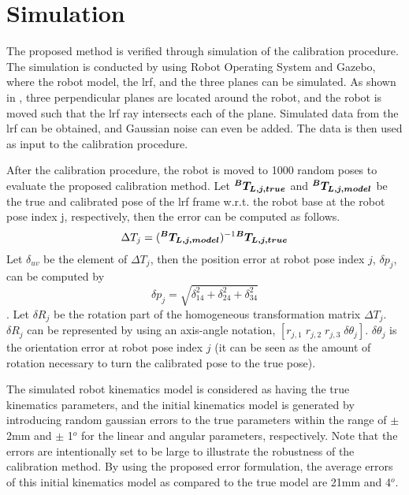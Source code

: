 \section{Simulation}
\label{sec:simulation}

The proposed method is verified through simulation of the calibration procedure. The simulation is conducted by using Robot Operating System and Gazebo, where the robot model, the \ac{lrf}, and the three planes can be simulated.  
As shown in , three perpendicular planes are located around the robot, and the robot is moved such that the \ac{lrf} ray intersects each of the plane. Simulated data from the \ac{lrf} can be obtained, and Gaussian noise can even be added. The data is then used as input to the calibration procedure. 

After the calibration procedure, the robot is moved to 1000 random poses to evaluate the proposed calibration method. Let $\vb*{{^B}T_{L,j,true}}$ and $\vb*{{^B}T_{L,j,model}}$ be the true and calibrated pose of the \ac{lrf} frame w.r.t. the robot base at the robot pose index j, respectively, then the error can be computed as follows. 
\begin{equation}
\Delta T_j =  (\vb*{{^B}T_{L,j,model}})^{-1} \vb*{{^B}T_{L,j,true}}
\end{equation}
Let $\delta_{uv}$ be the element of $\Delta T_j$, then the position error at robot pose index $j$, $\delta p_j$, can be computed by
\begin{equation}
\delta p_j = \sqrt{\delta_{14}^2 + \delta_{24}^2 + \delta_{34}^2}
\end{equation}.
Let $\delta R_j$ be the rotation part of the homogeneous transformation matrix $\Delta T_j$. $\delta R_j$ can be represented by using an axis-angle notation, $[r_{j,1}\; r_{j,2}\; r_{j,3}\; \delta \theta_j]$. $\delta\theta_j$ is the orientation error at robot pose index $j$ (it can be seen as the amount of rotation necessary to turn the calibrated pose to the true pose). 

The simulated robot kinematics model is considered as having the true kinematics parameters, and the initial kinematics model is generated by introducing random gaussian errors to the true parameters within the range of $\pm$ 2mm and $\pm$ 1$^o$ for the linear and angular parameters, respectively. Note that the errors are intentionally set to be large to illustrate the robustness of the calibration method. By using the proposed error formulation, the average errors of this initial kinematics model as compared to the true model are 21mm and 4$^o$.


